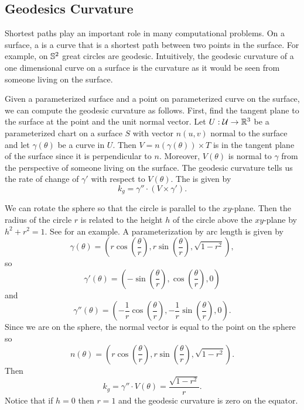 \subsection{Geodesics Curvature}

Shortest paths play an important role in many computational problems.
On a surface, a  is a curve that is a shortest path
between two points in the surface. 
For example, on $\mathbb{S}^2$ great circles are geodesic.
Intuitively, the geodesic curvature of a one dimensional curve on a surface
is the curvature as it would be seen from someone living on the surface.


Given a parameterized surface and a point on parameterized curve on the surface,
we can compute the geodesic curvature as follows.
First, find the tangent plane to the surface at the point and the unit normal vector.
Let $U:\mathcal{U}\to \mathbb{R}^3$ be a parameterized chart on a surface $S$ with vector $n(u,v)$ normal
to the surface
and let $\gamma(\theta)$ be a curve in $U$.
Then $V=n(\gamma(\theta))\times T$ is in the tangent plane of the surface since
it is perpendicular to $n$. Moreover, $V(\theta)$ is normal to $\gamma$ 
from the perspective of someone living on the surface. 
The geodesic curvature tells us the rate of change of $\gamma'$ with respect 
to $V(\theta)$.
The  is given by 
\begin{equation} \label{eqn:geodesic}
	k_g=\gamma'' \cdot (V\times \gamma').
\end{equation}

\begin{example}\label{eqn:circles-on-sphere}
	We can rotate the sphere so that the circle is parallel to the $xy$-plane.
	Then the radius of the circle $r$ is related to the height $h$ of the circle above the $xy$-plane
	by $h^2+r^2=1$. See  for an example.
	A parameterization by arc length is given by
	$$\gamma(\theta)=\left(r\cos\left(\frac{\theta}{r}\right),r\sin\left(\frac{\theta}{r}\right),\sqrt{1-r^2}\right),$$
	so
	$$\gamma'(\theta)=\left(-\sin\left(\frac{\theta}{r}\right),\cos\left(\frac{\theta}{r}\right),0\right)$$
	and
	$$\gamma''(\theta)=\left(-\frac{1}{r}\cos\left(\frac{\theta}{r}\right),-\frac{1}{r}\sin\left(\frac{\theta}{r}\right),0\right).$$
	Since we are on the sphere, the normal vector is equal to the point on the sphere
	so $$n(\theta)=\left(r\cos\left(\frac{\theta}{r}\right),r\sin\left(\frac{\theta}{r}\right),\sqrt{1-r^2}\right).$$
	Then 
	$$k_g=\gamma''\cdot V(\theta)=\frac{\sqrt{1-r^2}}{r}.$$
	Notice that if $h=0$ then $r=1$ and the geodesic curvature is zero on the equator.
\end{example}

